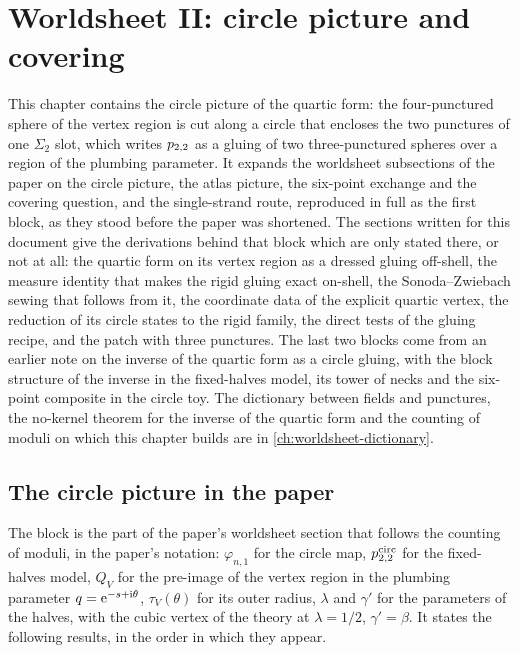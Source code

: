 \section{Worldsheet II: circle picture and covering}
\label{ch:worldsheet-circle}

This chapter contains the circle picture of the quartic form: the four-punctured sphere of the vertex region is cut along a circle that encloses the two punctures of one $\Sigma_2$ slot, which writes $p_{2,2}$ as a gluing of two three-punctured spheres over a region of the plumbing parameter.
It expands the worldsheet subsections of the paper on the circle picture, the atlas picture, the six-point exchange and the covering question, and the single-strand route, reproduced in full as the first block, as they stood before the paper was shortened.
The sections written for this document give the derivations behind that block which are only stated there, or not at all: the quartic form on its vertex region as a dressed gluing off-shell, the measure identity that makes the rigid gluing exact on-shell, the Sonoda--Zwiebach sewing that follows from it, the coordinate data of the explicit quartic vertex, the reduction of its circle states to the rigid family, the direct tests of the gluing recipe, and the patch with three punctures.
The last two blocks come from an earlier note on the inverse of the quartic form as a circle gluing, with the block structure of the inverse in the fixed-halves model, its tower of necks and the six-point composite in the circle toy.
The dictionary between fields and punctures, the no-kernel theorem for the inverse of the quartic form and the counting of moduli on which this chapter builds are in \cref{ch:worldsheet-dictionary}.

\subsection{The circle picture in the paper}
\label{sec:wscircle:paper}

The block is the part of the paper's worldsheet section that follows the counting of moduli, in the paper's notation: $\varphi_{n,1}$ for the circle map, $p_{2,2}^{\mathrm{circ}}$ for the fixed-halves model, $Q_V$ for the pre-image of the vertex region in the plumbing parameter $q = \mathrm{e}^{- s + \mathrm{i} \theta}$, $\tau_V(\theta)$ for its outer radius, $\lambda$ and $\gamma'$ for the parameters of the halves, with the cubic vertex of the theory at $\lambda = 1 / 2$, $\gamma' = \beta$.
It states the following results, in the order in which they appear.

